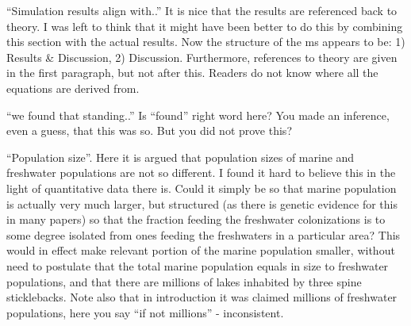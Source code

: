 \begin{point}{\revref}
``Simulation results align with..'' It is nice that the results are referenced back to theory. I was left to think that it might have been better to do this by combining this section with the actual results. Now the structure of the ms appears to be: 1) Results \& Discussion, 2) Discussion. Furthermore, references to theory are given in the first paragraph, but not after this. Readers do not know where all the equations are derived from.
\end{point}


\begin{point}{\revref}
``we found that standing..'' Is ``found'' right word here? You made an inference, even a guess, that this was so. But you did not prove this?
\end{point}


\begin{point}{\revref}
    ``Population size''. Here it is argued that population sizes of marine and
    freshwater populations are not so different. I found it hard to believe this in
    the light of quantitative data there is. Could it simply be so that marine
    population is actually very much larger, but structured (as there is genetic
    evidence for this in many papers) so that the fraction feeding the freshwater
    colonizations is to some degree isolated from ones feeding the freshwaters in a
    particular area? This would in effect make relevant portion of the marine
    population smaller, without need to postulate that the total marine population
    equals in size to freshwater populations, and that there are millions of lakes
    inhabited by three spine sticklebacks. Note also that in introduction it was
    claimed millions of freshwater populations, here you say ``if not millions'' -
    inconsistent. 
\end{point}





